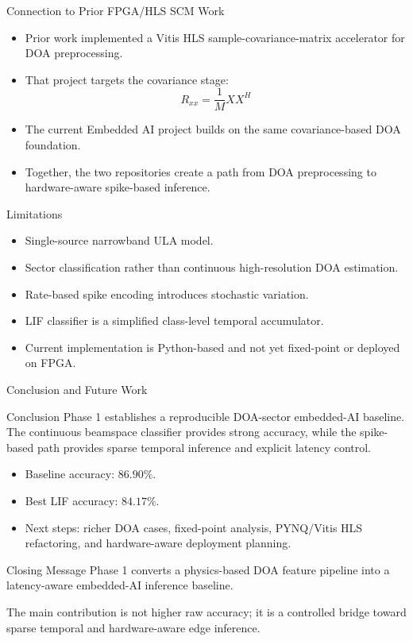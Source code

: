\documentclass[aspectratio=169]{beamer}
\begin{document}
\begin{frame}{Connection to Prior FPGA/HLS SCM Work}
\begin{itemize}
    \item Prior work implemented a Vitis HLS sample-covariance-matrix accelerator for DOA preprocessing.
    \item That project targets the covariance stage:
    \[
        R_{xx}=\frac{1}{M}XX^{H}
    \]
    \item The current Embedded AI project builds on the same covariance-based DOA foundation.
    \item Together, the two repositories create a path from DOA preprocessing to hardware-aware spike-based inference.
\end{itemize}
\end{frame}

\begin{frame}{Limitations}
\begin{itemize}
    \item Single-source narrowband ULA model.
    \item Sector classification rather than continuous high-resolution DOA estimation.
    \item Rate-based spike encoding introduces stochastic variation.
    \item LIF classifier is a simplified class-level temporal accumulator.
    \item Current implementation is Python-based and not yet fixed-point or deployed on FPGA.
\end{itemize}
\end{frame}

\begin{frame}{Conclusion and Future Work}
\begin{block}{Conclusion}
Phase 1 establishes a reproducible DOA-sector embedded-AI baseline. The continuous beamspace classifier provides strong accuracy, while the spike-based path provides sparse temporal inference and explicit latency control.
\end{block}
\begin{itemize}
    \item Baseline accuracy: $86.90\%$.
    \item Best LIF accuracy: $84.17\%$.
    \item Next steps: richer DOA cases, fixed-point analysis, PYNQ/Vitis HLS refactoring, and hardware-aware deployment planning.
\end{itemize}
\end{frame}

\begin{frame}{Closing Message}
\centering
\Large
Phase 1 converts a physics-based DOA feature pipeline into a latency-aware embedded-AI inference baseline.

\vspace{0.5cm}
\normalsize
The main contribution is not higher raw accuracy; it is a controlled bridge toward sparse temporal and hardware-aware edge inference.
\end{frame}
\end{document}
